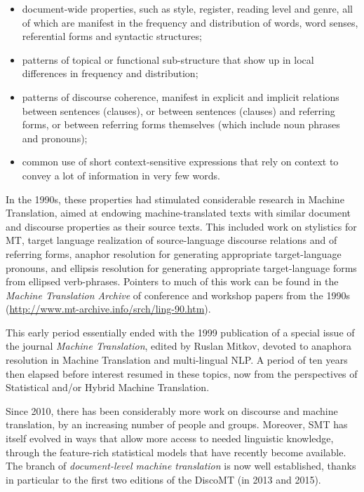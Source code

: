 \documentclass[11pt]{article}
\begin{document}
\begin{itemize}
\item document-wide properties, such as style, register,
  reading level and genre, all of which are manifest in the frequency
  and distribution of words, word senses, referential forms and
  syntactic structures; 
\item patterns of topical or functional sub-structure that show up
   in local differences in frequency and distribution;
\item patterns of discourse coherence, manifest in explicit and
  implicit relations between sentences (clauses), or between
  sentences (clauses) and referring forms, or between referring forms
  themselves (which include noun phrases and pronouns);
\item common use of short context-sensitive expressions that rely on
  context to convey a lot of information in very few words.
\end{itemize}

In the 1990s, these properties had stimulated considerable research in
Machine Translation, aimed at endowing machine-translated texts with
similar document and discourse properties as their source texts.
This included work on stylistics for MT, target language realization of 
source-language discourse
relations and of referring forms, anaphor resolution for generating
appropriate target-language pronouns, and ellipsis
resolution for generating appropriate target-language forms from
ellipsed verb-phrases. Pointers to much of this work can
be found in the \textit{Machine Translation Archive} of conference
and workshop papers from the 1990s (\url{http://www.mt-archive.info/srch/ling-90.htm}).

This early period essentially ended with the 1999 publication of a special
issue of the journal \textit{Machine Translation}, edited by Ruslan Mitkov,
devoted to anaphora resolution in Machine Translation and multi-lingual NLP.
A period of ten years then elapsed before interest resumed in these topics,
now from the perspectives of Statistical and/or Hybrid Machine
Translation.  

Since 2010, there has
been considerably more work on discourse and machine translation, by 
an increasing number of people and groups. Moreover, SMT
has itself evolved in ways that allow more access to needed linguistic knowledge,
through the feature-rich statistical models that have recently become available.
The branch of \textit{document-level machine translation} is
now well established, thanks in particular to the first two editions of
the DiscoMT (in 2013 and 2015). 
\end{document}
